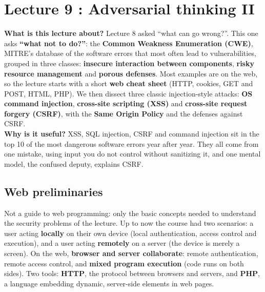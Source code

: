 \chapter{Lecture 9 : Adversarial thinking II}

\begin{rembox}[title=In a nutshell]
\textbf{What is this lecture about?} Lecture 8 asked ``what can go wrong?''. This one asks
\textbf{``what not to do?''}: the \textbf{Common Weakness Enumeration (CWE)}, MITRE's database of
the software errors that most often lead to vulnerabilities, grouped in three classes:
\textbf{insecure interaction between components}, \textbf{risky resource management} and
\textbf{porous defenses}. Most examples are on the web, so the lecture starts with a short
\textbf{web cheat sheet} (HTTP, cookies, GET and POST, HTML, PHP). We then dissect three classic
injection-style attacks: \textbf{OS command injection}, \textbf{cross-site scripting (XSS)} and
\textbf{cross-site request forgery (CSRF)}, with the \textbf{Same Origin Policy} and the defenses
against CSRF. \\
\textbf{Why is it useful?} XSS, SQL injection, CSRF and command injection sit in the top 10 of the
most dangerous software errors year after year. They all come from one mistake, using input you do
not control without sanitizing it, and one mental model, the confused deputy, explains CSRF.
\end{rembox}

\section{Web preliminaries}

\begin{rembox}[title=Why this cheat sheet]
Not a guide to web programming: only the basic concepts needed to understand the security problems
of the lecture. Up to now the course had two scenarios: a user acting \textbf{locally} on their
own device (local authentication, access control and execution), and a user acting
\textbf{remotely} on a server (the device is merely a screen). On the web, \textbf{browser and
server collaborate}: remote authentication, remote access control, and \textbf{mixed program
execution} (code runs on both sides). Two tools: \textbf{HTTP}, the protocol between browsers and
servers, and \textbf{PHP}, a language embedding dynamic, server-side elements in web pages.
\end{rembox}


